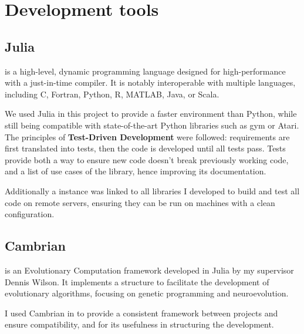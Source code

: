 \section{Development tools}
\subsection{Julia}
    
 is a high-level, dynamic programming language designed for high-performance with a just-in-time compiler. It is notably interoperable with multiple languages, including C, Fortran, Python, R, MATLAB, Java, or Scala. \cite{julia-lang}

We used Julia in this project to provide a faster environment than Python, while still being compatible with state-of-the-art Python libraries such as gym or Atari.
\\

The principles of \textbf{Test-Driven Development} were followed: requirements are first translated into tests, then the code is developed until all tests pass. Tests provide both a way to ensure new code doesn't break previously working code, and a list of use cases of the library, hence improving its documentation.

Additionally a  instance was linked to all libraries I developed to build and test all code on remote servers, ensuring they can be run on machines with a clean configuration. 

\subsection{Cambrian}

 is an Evolutionary Computation framework developed in Julia by my supervisor Dennis Wilson. It implements a structure to facilitate the development of evolutionary algorithms, focusing on genetic programming and neuroevolution. 

I used Cambrian in to provide a consistent framework between projects and ensure compatibility, and for its usefulness in structuring the development.

